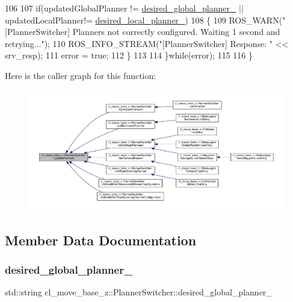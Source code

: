 \begin{DoxyCode}
106 
107     \textcolor{keywordflow}{if}(updatedGlobalPlanner != \hyperlink{classcl__move__base__z_1_1PlannerSwitcher_aef047d3778b2993c1df146bbad43e03d}{desired\_global\_planner\_} || updatedLocalPlanner!= 
      \hyperlink{classcl__move__base__z_1_1PlannerSwitcher_a6cbf65f11bb69125f913caaabdf7b4cf}{desired\_local\_planner\_})
108     \{
109       ROS\_WARN(\textcolor{stringliteral}{"[PlannerSwitcher] Planners not correctly configured. Waiting 1 second and retrying..."});
110       ROS\_INFO\_STREAM(\textcolor{stringliteral}{"[PlannerSwitcher] Response: "} << srv\_resp);
111       error = \textcolor{keyword}{true};
112     \}
113 
114   \}\textcolor{keywordflow}{while}(error);
115 
116 \}
\end{DoxyCode}
Here is the caller graph for this function\+:
\nopagebreak
\begin{figure}[H]
\begin{center}
\leavevmode
\includegraphics[width=350pt]{classcl__move__base__z_1_1PlannerSwitcher_a146641f63aea3185daab4c5cbb789550_icgraph}
\end{center}
\end{figure}


\subsection{Member Data Documentation}
\mbox{\label{classcl__move__base__z_1_1PlannerSwitcher_aef047d3778b2993c1df146bbad43e03d}} 
\subsubsection{\texorpdfstring{desired\+\_\+global\+\_\+planner\+\_\+}{desired\_global\_planner\_}}
{\footnotesize\ttfamily std\+::string cl\+\_\+move\+\_\+base\+\_\+z\+::\+Planner\+Switcher\+::desired\+\_\+global\+\_\+planner\+\_\+\hspace{0.3cm}{\ttfamily [private]}}



